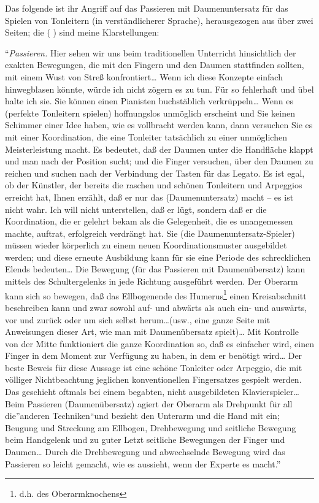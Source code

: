 Das folgende ist ihr Angriff auf das Passieren mit Daumenuntersatz für das Spielen von Tonleitern (in verständlicherer Sprache), herausgezogen aus über zwei Seiten; die ( ) sind meine Klarstellungen:

\enquote{\textit{Passieren.} Hier sehen wir uns beim traditionellen Unterricht hinsichtlich der exakten Bewegungen, die mit den Fingern und den Daumen stattfinden sollten, mit einem Wust von Streß konfrontiert\dots
Wenn ich diese Konzepte einfach hinwegblasen könnte, würde ich nicht zögern es zu tun.
Für so fehlerhaft und übel halte ich sie.
Sie können einen Pianisten buchstäblich verkrüppeln\dots
Wenn es (perfekte Tonleitern spielen) hoffnungslos unmöglich erscheint und Sie keinen Schimmer einer Idee haben, wie es vollbracht werden kann, dann versuchen Sie es mit einer Koordination, die eine Tonleiter tatsächlich zu einer unmöglichen Meisterleistung macht.
Es bedeutet, daß der Daumen unter die Handfläche klappt und man nach der Position sucht; und die Finger versuchen, über den Daumen zu reichen und suchen nach der Verbindung der Tasten für das Legato.
Es ist egal, ob der Künstler, der bereits die  raschen und schönen Tonleitern und Arpeggios erreicht hat, Ihnen erzählt, daß er nur das (Daumenuntersatz) macht -- es ist nicht wahr.
Ich will nicht unterstellen, daß er lügt, sondern daß er die Koordination, die er gelehrt bekam als die Gelegenheit, die es unangemessen machte, auftrat, erfolgreich verdrängt hat.
Sie (die Daumenuntersatz-Spieler) müssen wieder körperlich zu einem neuen Koordinationsmuster ausgebildet werden; und diese erneute Ausbildung kann für sie eine Periode des schrecklichen Elends bedeuten\dots
Die Bewegung (für das Passieren mit Daumenübersatz) kann mittels des Schultergelenks in jede Richtung ausgeführt werden.
Der Oberarm kann sich so bewegen, daß das Ellbogenende des Humerus\footnote{d.h. des Oberarmknochens} einen Kreisabschnitt beschreiben kann und zwar sowohl auf- und abwärts als auch ein- und auswärts, vor und zurück oder um sich selbst herum\dots (usw., eine ganze Seite mit Anweisungen dieser Art, wie man mit Daumenübersatz spielt)\dots
Mit Kontrolle von der Mitte funktioniert die ganze Koordination so, daß es einfacher wird, einen Finger in dem Moment zur Verfügung zu haben, in dem er benötigt wird\dots
Der beste Beweis für diese Aussage ist eine schöne Tonleiter oder Arpeggio, die mit völliger Nichtbeachtung jeglichen konventionellen Fingersatzes gespielt werden.
Das geschieht oftmals bei einem begabten, nicht ausgebildeten Klavierspieler\dots
Beim Passieren (Daumenübersatz) agiert der Oberarm als Drehpunkt für all die}anderen Techniken\enquote{und bezieht den Unterarm und die Hand mit ein; Beugung und Streckung am Ellbogen, Drehbewegung und seitliche Bewegung beim Handgelenk und zu guter Letzt seitliche Bewegungen der Finger und Daumen\dots
Durch die Drehbewegung und abwechselnde Bewegung wird das Passieren so leicht gemacht, wie es aussieht, wenn der Experte es macht.}

